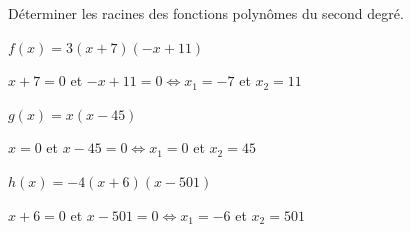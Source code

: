 \documentclass[12pt,a4paper]{article}  %
\begin{document}
\begin{center}

\end{center}


%
%
\vspace*{-.8cm} 


Déterminer les racines des fonctions polynômes du second degré.
\begin{enumMet}
	\item {} $f(x)=3(x+7)(-x+11)$
	\begin{corrBox}
		$x+7=0$ et $-x+11=0 \iff x_1=-7$ et $x_2=11$ 
	\end{corrBox}
	\item $g(x)=x(x-45)$ 
	\begin{corrBox}
		$x=0$ et $x-45=0 \iff x_1=0$ et $x_2=45$
	\end{corrBox}
	\item $h(x)=-4(x+6)(x-501)$ 
	\begin{corrBox}
		$ x+6=0$ et $x-501=0 \iff x_1=-6$ et $x_2=501$
	\end{corrBox}
\end{enumMet}

\vspace*{-0.6cm}
\end{document}
